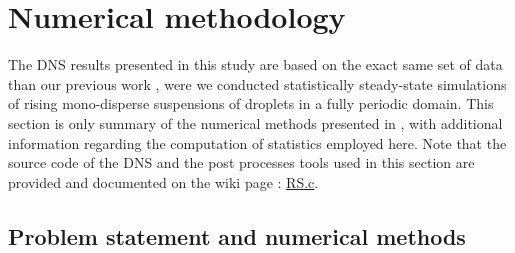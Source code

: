 
\section{Numerical methodology}
\label{sec:methodo}

The DNS results presented in this study are based on the exact same set of data than our previous work \citet{fintzi2024buoyancy}, were we conducted statistically steady-state simulations of rising mono-disperse suspensions of droplets in a fully periodic domain. 
This section is only summary of the numerical methods presented in \citet{fintzi2024buoyancy}, with additional information regarding the computation of statistics employed here. 
Note that the source code of the DNS and the post processes tools used in this section are provided and documented on the wiki page : \href{http://basilisk.fr/sandbox/fintzin/Rising-suspension/RS.c}{RS.c}. 



\subsection{Problem statement and numerical methods}


